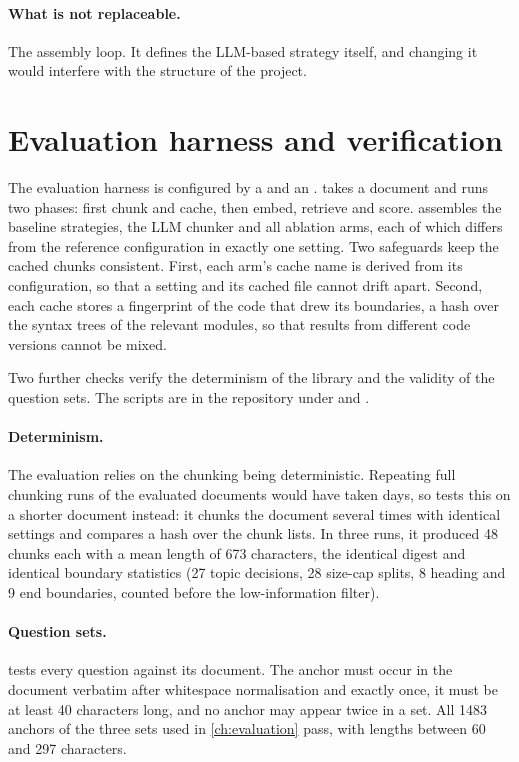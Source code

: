 \paragraph{What is not replaceable.} The assembly loop. It defines the LLM-based strategy
itself, and changing it would interfere with the structure of the project.

\section{Evaluation harness and verification}
\label{sec:harness}
\label{sec:testing}

The evaluation harness is configured by a  and an .
 takes a document and runs two phases: first chunk and cache, then embed,
retrieve and score.  assembles the baseline strategies, the LLM
chunker and all ablation arms, each of which differs from the reference configuration in
exactly one setting. Two safeguards keep the cached chunks consistent. First, each arm's
cache name is derived from its configuration, so that a setting and its cached file cannot
drift apart. Second, each cache stores a fingerprint of the code that drew its boundaries,
a hash over the syntax trees of the relevant modules, so that results from different code
versions cannot be mixed.

Two further checks verify the determinism of the library and the validity of the question
sets. The scripts are in the repository under  and .

\paragraph{Determinism.}
\label{sec:verify-determinism}
The evaluation relies on the chunking being deterministic. Repeating full chunking runs of
the evaluated documents would have taken days, so  tests this on
a shorter document instead: it chunks the document several times with identical settings
and compares a hash over the chunk lists. In three runs, it produced \num{48} chunks each
with a mean length of \num{673} characters, the identical digest and identical boundary
statistics (\num{27} topic decisions, \num{28} size-cap splits, \num{8} heading and \num{9}
end boundaries, counted before the low-information filter).

\paragraph{Question sets.}
\label{sec:verify-questions}
 tests every question against its document. The anchor
must occur in the document verbatim after whitespace normalisation and exactly once, it
must be at least 40 characters long, and no anchor may appear twice in a set. All
\num{1483} anchors of the three sets used in \cref{ch:evaluation} pass, with lengths
between \num{60} and \num{297} characters.


